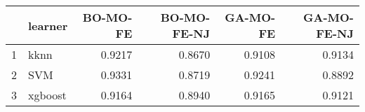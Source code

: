 \begin{table}[ht]
\centering
\begin{tabular}{rlrrrr}
  \hline
 & learner & BO-MO-FE & BO-MO-FE-NJ & GA-MO-FE & GA-MO-FE-NJ \\ 
  \hline
1 & kknn & 0.9217 & 0.8670 & 0.9108 & 0.9134 \\ 
  2 & SVM & 0.9331 & 0.8719 & 0.9241 & 0.8892 \\ 
  3 & xgboost & 0.9164 & 0.8940 & 0.9165 & 0.9121 \\ 
   \hline
\end{tabular}
\end{table}
